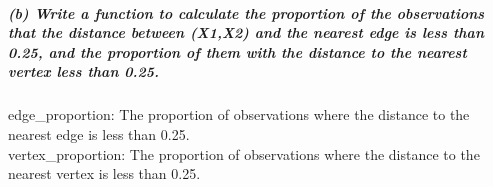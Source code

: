 \documentclass[
]{article}
\newenvironment{Shaded}{\begin{snugshade}}{\end{snugshade}}
\newcommand{\CommentTok}[1]{\textcolor[rgb]{0.56,0.35,0.01}{\textit{#1}}}
\newcommand{\ControlFlowTok}[1]{\textcolor[rgb]{0.13,0.29,0.53}{\textbf{#1}}}
\newcommand{\DecValTok}[1]{\textcolor[rgb]{0.00,0.00,0.81}{#1}}
\newcommand{\FloatTok}[1]{\textcolor[rgb]{0.00,0.00,0.81}{#1}}
\newcommand{\FunctionTok}[1]{\textcolor[rgb]{0.13,0.29,0.53}{\textbf{#1}}}
\newcommand{\NormalTok}[1]{#1}
\newcommand{\OtherTok}[1]{\textcolor[rgb]{0.56,0.35,0.01}{#1}}
\newcommand{\SpecialCharTok}[1]{\textcolor[rgb]{0.81,0.36,0.00}{\textbf{#1}}}
\begin{document}
\subparagraph{(b) Write a function to calculate the proportion of the
observations that the distance between (X1,X2) and the nearest edge is
less than 0.25, and the proportion of them with the distance to the
nearest vertex less than
0.25.}\label{b-write-a-function-to-calculate-the-proportion-of-the-observations-that-the-distance-between-x1x2-and-the-nearest-edge-is-less-than-0.25-and-the-proportion-of-them-with-the-distance-to-the-nearest-vertex-less-than-0.25.}

edge\_proportion: The proportion of observations where the distance to
the nearest edge is less than 0.25.\\
vertex\_proportion: The proportion of observations where the distance to
the nearest vertex is less than 0.25.

\begin{Shaded}
\end{Shaded}
\end{document}
